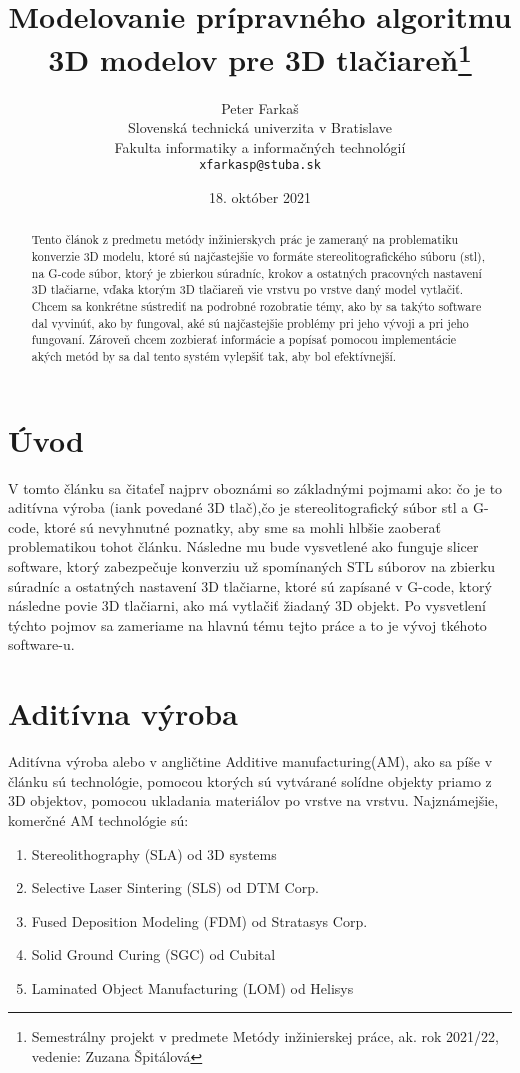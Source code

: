 \documentclass[10pt,twoside,slovak,a4paper]{article}
\title{Modelovanie prípravného algoritmu 3D modelov pre 3D tlačiareň\thanks{Semestrálny projekt v predmete Metódy inžinierskej práce, ak. rok 2021/22, vedenie: Zuzana Špitálová}} %
\author{Peter Farkaš\\[2pt]
	{\small Slovenská technická univerzita v Bratislave}\\
	{\small Fakulta informatiky a informačných technológií}\\
	{\small \texttt{xfarkasp@stuba.sk}}
	}
\date{\small 18. október 2021} %
\begin{document}
\maketitle

\newpage
\begin{abstract}
Tento článok z predmetu metódy inžinierskych prác je zameraný na problematiku konverzie 3D modelu, ktoré sú najčastejšie vo formáte stereolitografického súboru (stl), na G-code súbor, ktorý je zbierkou súradníc, krokov a ostatných pracovných nastavení 3D tlačiarne, vďaka ktorým 3D tlačiareň vie vrstvu po vrstve daný model vytlačiť. Chcem sa konkrétne sústrediť na podrobné rozobratie témy, ako by sa takýto software dal vyvinúť, ako by fungoval, aké sú najčastejšie problémy pri jeho vývoji a pri jeho fungovaní. Zároveň chcem zozbierať informácie a popísať pomocou implementácie akých metód by sa dal tento systém vylepšiť tak, aby bol efektívnejší.
\end{abstract}

\section{Úvod}
V tomto článku sa čitaťeľ najprv oboznámi so základnými pojmami ako: čo je to aditívna výroba (iank povedané 3D tlač),čo je stereolitografický súbor stl a G-code, ktoré sú nevyhnutné poznatky, aby sme sa mohli hlbšie zaoberať problematikou tohot článku. Následne mu bude vysvetlené ako funguje slicer software, ktorý zabezpečuje konverziu už spomínaných STL súborov na zbierku súradníc a ostatných nastavení 3D tlačiarne, ktoré sú zapísané v G-code, ktorý následne povie 3D tlačiarni, ako má vytlačiť žiadaný 3D objekt. Po vysvetlení týchto pojmov sa zameriame na hlavnú tému tejto práce a to je vývoj tkéhoto software-u. 

\section{Aditívna výroba}
Aditívna výroba alebo v angličtine Additive manufacturing(AM), ako sa píše v článku \cite{2} sú technológie, pomocou ktorých sú vytvárané solídne objekty priamo z 3D objektov, pomocou ukladania materiálov  po vrstve na vrstvu. 
Najznámejšie, komerčné AM technológie sú:

\begin{enumerate}
    \item Stereolithography (SLA) od 3D systems
    \item Selective Laser Sintering  (SLS) od DTM Corp.
    \item Fused  Deposition  Modeling (FDM) od Stratasys  Corp.
    \item Solid  Ground  Curing  (SGC)  od Cubital
    \item Laminated Object Manufacturing (LOM) od Helisys
\end{enumerate}
\end{document}

